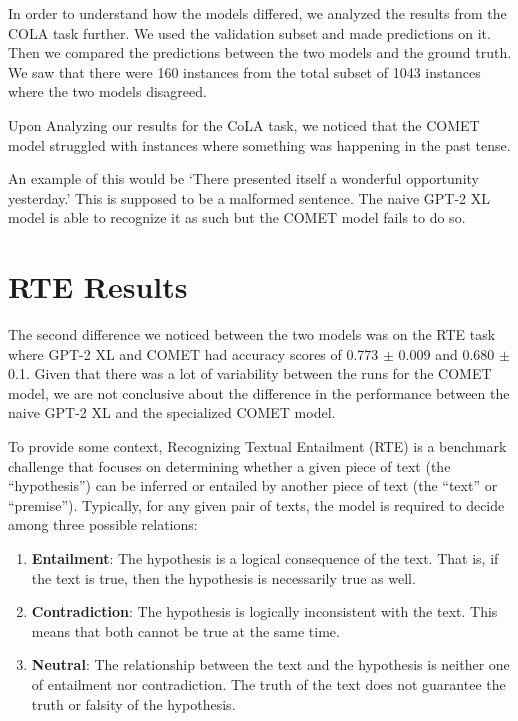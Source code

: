 \documentclass[\main/thesis.tex]{subfiles}
\begin{document}
In order to understand how the models differed, we analyzed the results from the COLA task further. 
We used the validation subset and made predictions on it. Then we compared the predictions between
the two models and the ground truth. We saw that there were 160 instances from the total 
subset of 1043 instances where the two models disagreed. 

Upon Analyzing our results for the CoLA task, we noticed that the COMET 
model struggled with instances where something was happening in the past tense.

An example of this would be `There presented itself a wonderful opportunity yesterday.' 
This is supposed to be a malformed sentence. The naive GPT-2 XL model is able to 
recognize it as such but the COMET model fails to do so. 

\section{RTE Results}\label{sec:rte_results}

The second difference we noticed between the two models was on the RTE task where GPT-2 XL
 and COMET had accuracy scores of 0.773 $\pm$ 0.009 and 0.680 $\pm$ 0.1. Given that
there was a lot of variability between the runs for the COMET model, we are not conclusive
about the difference in the performance between the naive GPT-2 XL and the specialized
COMET model. 

To provide some context, Recognizing Textual Entailment (RTE) is a benchmark challenge 
that focuses on determining whether a given piece of text (the ``hypothesis'') can be inferred or 
entailed by another piece of text (the ``text'' or ``premise''). Typically, for any given pair of texts, 
the model is required to decide among three possible relations:

\begin{enumerate}
    \item \textbf{Entailment}: The hypothesis is a logical consequence of the text. That is, 
    if the text is true, then the hypothesis is necessarily true as well.
    \item \textbf{Contradiction}: The hypothesis is logically inconsistent with the text. 
    This means that both cannot be true at the same time.
    \item \textbf{Neutral}: The relationship between the text and the hypothesis is neither one of entailment nor contradiction. 
    The truth of the text does not guarantee the truth or falsity of the hypothesis.
\end{enumerate}
\end{document}
